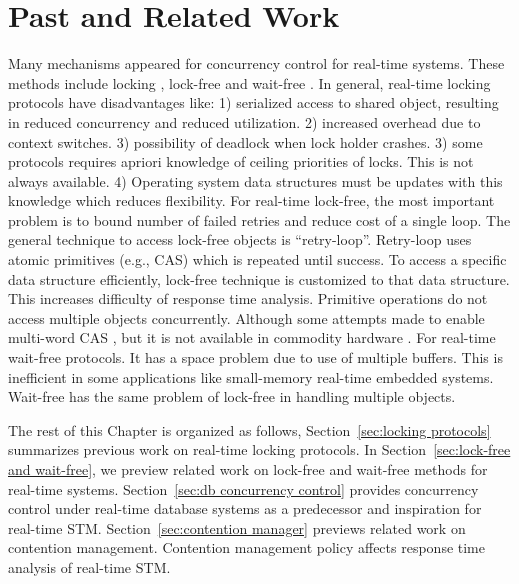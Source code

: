 \documentclass[12pt,english]{report}
\begin{document}

\chapter{\label{related_work}Past and Related Work}

Many mechanisms appeared for concurrency control for real-time systems.
These methods include locking \cite{Levine:2012:PIF:2148436.2148438,Buttazzo:2004:HRC:1027504},
lock-free \cite{anderson96framework,563704,anderson1997lock,holman2006supporting,Lai:2009:SSR:1529282.1529660,1656921,726426,4297311,5669659,key-5}
and wait-free \cite{726426,1508449,Cho:2006:UAP:1141277.1141490,4297311,1003807,hohmuth2001pragmatic,1613351,811240,896371,896423,1203552,5953690}.
In general, real-time locking protocols have disadvantages like: 1) serialized access to shared object, resulting in reduced concurrency and reduced utilization. 2) increased overhead due to context switches. 3) possibility of deadlock when lock holder crashes.  3) some protocols requires apriori knowledge of ceiling priorities of locks. This is not always available. 4) Operating system data structures must be updates with this knowledge which reduces flexibility. For real-time lock-free, the most important problem is to bound number of failed retries and reduce cost of a single loop. The general technique to access lock-free objects is {}``retry-loop''. Retry-loop uses atomic primitives (e.g., CAS) which is repeated until success. To access a specific data structure efficiently, lock-free technique is customized to that data structure. This increases difficulty of response time analysis. Primitive operations do not access multiple objects concurrently. Although some attempts made to enable multi-word CAS \cite{563704}, but it is not available in commodity hardware \cite{Meawad:2011:RWQ:2043910.2043912}. For real-time wait-free protocols. It has a space problem due to use of multiple buffers. This is inefficient in some applications like small-memory real-time embedded systems. Wait-free has the same problem of lock-free in handling multiple objects.

The rest of this Chapter is organized as follows, Section~\ref{sec:locking protocols} summarizes previous work on real-time locking protocols. In Section~\ref{sec:lock-free and wait-free}, we preview related work on lock-free and wait-free methods for real-time systems. Section~\ref{sec:db concurrency control} provides concurrency control under real-time database systems as a predecessor and inspiration for real-time STM. Section~\ref{sec:contention manager} previews related work on contention management. Contention management policy affects response time analysis of real-time STM.
\end{document}
